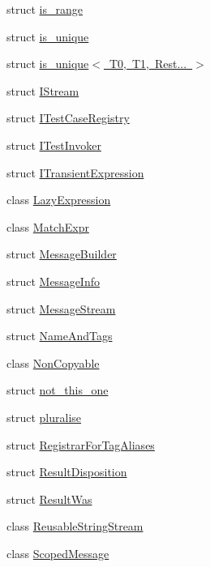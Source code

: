 \begin{DoxyCompactItemize}
\item 
struct \mbox{\hyperlink{struct_catch_1_1is__range}{is\+\_\+range}}
\item 
struct \mbox{\hyperlink{struct_catch_1_1is__unique}{is\+\_\+unique}}
\item 
struct \mbox{\hyperlink{struct_catch_1_1is__unique_3_01_t0_00_01_t1_00_01_rest_8_8_8_01_4}{is\+\_\+unique$<$ T0, T1, Rest... $>$}}
\item 
struct \mbox{\hyperlink{struct_catch_1_1_i_stream}{I\+Stream}}
\item 
struct \mbox{\hyperlink{struct_catch_1_1_i_test_case_registry}{I\+Test\+Case\+Registry}}
\item 
struct \mbox{\hyperlink{struct_catch_1_1_i_test_invoker}{I\+Test\+Invoker}}
\item 
struct \mbox{\hyperlink{struct_catch_1_1_i_transient_expression}{I\+Transient\+Expression}}
\item 
class \mbox{\hyperlink{class_catch_1_1_lazy_expression}{Lazy\+Expression}}
\item 
class \mbox{\hyperlink{class_catch_1_1_match_expr}{Match\+Expr}}
\item 
struct \mbox{\hyperlink{struct_catch_1_1_message_builder}{Message\+Builder}}
\item 
struct \mbox{\hyperlink{struct_catch_1_1_message_info}{Message\+Info}}
\item 
struct \mbox{\hyperlink{struct_catch_1_1_message_stream}{Message\+Stream}}
\item 
struct \mbox{\hyperlink{struct_catch_1_1_name_and_tags}{Name\+And\+Tags}}
\item 
class \mbox{\hyperlink{class_catch_1_1_non_copyable}{Non\+Copyable}}
\item 
struct \mbox{\hyperlink{struct_catch_1_1not__this__one}{not\+\_\+this\+\_\+one}}
\item 
struct \mbox{\hyperlink{struct_catch_1_1pluralise}{pluralise}}
\item 
struct \mbox{\hyperlink{struct_catch_1_1_registrar_for_tag_aliases}{Registrar\+For\+Tag\+Aliases}}
\item 
struct \mbox{\hyperlink{struct_catch_1_1_result_disposition}{Result\+Disposition}}
\item 
struct \mbox{\hyperlink{struct_catch_1_1_result_was}{Result\+Was}}
\item 
class \mbox{\hyperlink{class_catch_1_1_reusable_string_stream}{Reusable\+String\+Stream}}
\item 
class \mbox{\hyperlink{class_catch_1_1_scoped_message}{Scoped\+Message}}

\end{DoxyCompactItemize}
